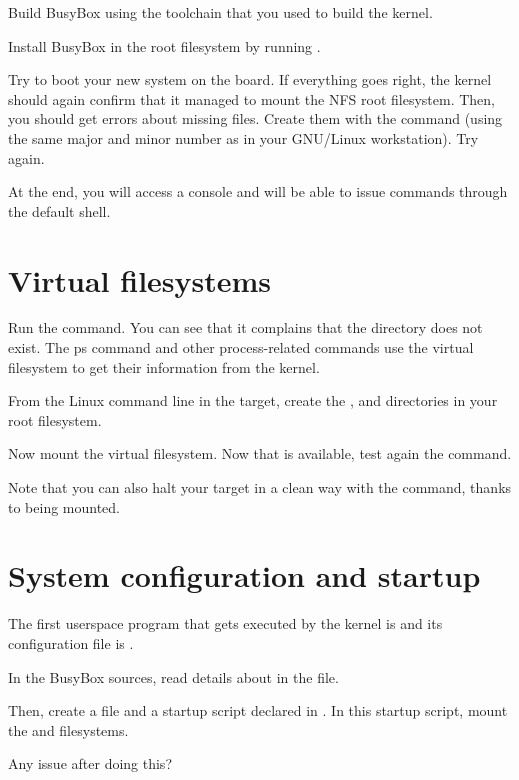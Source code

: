 Build BusyBox using the toolchain that you used to build the kernel.

Install BusyBox in the root filesystem by running .

Try to boot your new system on the board. If everything goes right,
the kernel should again confirm that it managed to mount the NFS root
filesystem. Then, you should get errors about missing 
files. Create them with the  command (using the same major
and minor number as in your GNU/Linux workstation). Try again.

At the end, you will access a console and will be able to issue
commands through the default shell.

\section{Virtual filesystems}

Run the  command. You can see that it complains that the
 directory does not exist. The ps command and other
process-related commands use the  virtual filesystem to get
their information from the kernel.

From the Linux command line in the target, create the ,  and
 directories in your root filesystem.

Now mount the  virtual filesystem. Now that  is
available, test again the  command.

Note that you can also halt your target in a clean way with the 
command, thanks to  being mounted.

\section{System configuration and startup}

The first userspace program that gets executed by the kernel is
 and its configuration file is .

In the BusyBox sources, read details about  in the
 file.

Then, create a  file and a 
startup script declared in . In this startup
script, mount the  and  filesystems.

Any issue after doing this?


